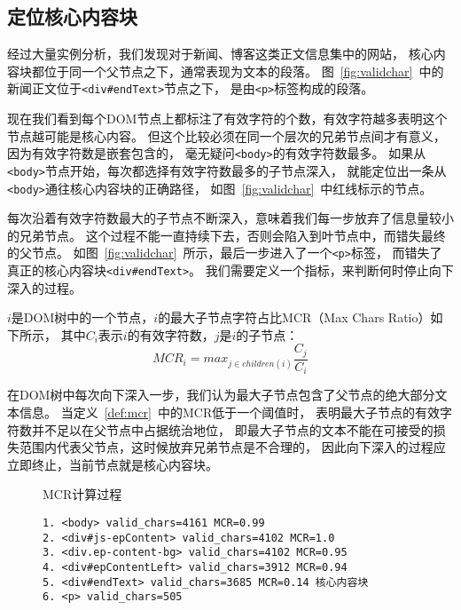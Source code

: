 \subsection{定位核心内容块}
经过大量实例分析，我们发现对于新闻、博客这类正文信息集中的网站，
核心内容块都位于同一个父节点之下，通常表现为文本的段落。
图~\ref{fig:validchar}~中的新闻正文位于\texttt{<div\#endText>}节点之下，
是由\texttt{<p>}标签构成的段落。

现在我们看到每个DOM节点上都标注了有效字符的个数，有效字符越多表明这个节点越可能是核心内容。
但这个比较必须在同一个层次的兄弟节点间才有意义，因为有效字符数是嵌套包含的，
毫无疑问\texttt{<body>}的有效字符数最多。
如果从\texttt{<body>}节点开始，每次都选择有效字符数最多的子节点深入，
就能定位出一条从\texttt{<body>}通往核心内容块的正确路径，
如图~\ref{fig:validchar}~中红线标示的节点。

每次沿着有效字符数最大的子节点不断深入，意味着我们每一步放弃了信息量较小的兄弟节点。
这个过程不能一直持续下去，否则会陷入到叶节点中，而错失最终的父节点。
如图~\ref{fig:validchar}~所示，最后一步进入了一个\texttt{<p>}标签，
而错失了真正的核心内容块\texttt{<div\#endText>}。
我们需要定义一个指标，来判断何时停止向下深入的过程。

\begin{definition}
\label{def:mcr}
$i$是DOM树中的一个节点，$i$的最大子节点字符占比MCR（Max Chars Ratio）如下所示，
其中$C_i$表示$i$的有效字符数，$j$是$i$的子节点：
\begin{equation}
MCR_i = max_{j \in children(i)} \frac{C_j}{C_i}
\end{equation}
\end{definition}

在DOM树中每次向下深入一步，我们认为最大子节点包含了父节点的绝大部分文本信息。
当定义~\ref{def:mcr}~中的MCR低于一个阈值时，
表明最大子节点的有效字符数并不足以在父节点中占据统治地位，
即最大子节点的文本不能在可接受的损失范围内代表父节点，这时候放弃兄弟节点是不合理的，
因此向下深入的过程应立即终止，当前节点就是核心内容块。

\begin{figure}[htbp]
\begin{example}
\label{ex:mcr}
MCR计算过程
\end{example}
\begin{verbatim}
1. <body> valid_chars=4161 MCR=0.99
2. <div#js-epContent> valid_chars=4102 MCR=1.0
3. <div.ep-content-bg> valid_chars=4102 MCR=0.95
4. <div#epContentLeft> valid_chars=3912 MCR=0.94
5. <div#endText> valid_chars=3685 MCR=0.14 核心内容块
6. <p> valid_chars=505
\end{verbatim}
\end{figure}

